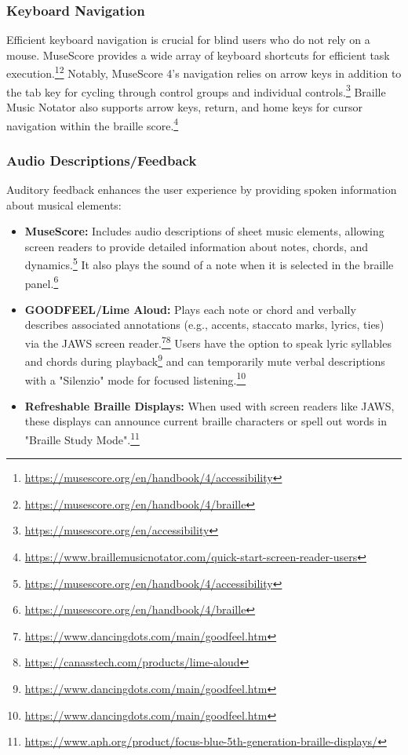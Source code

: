 \subsubsection{Keyboard Navigation}
Efficient keyboard navigation is crucial for blind users who do not rely on a mouse. MuseScore provides a wide array of keyboard shortcuts for efficient task execution.\footnote{\url{https://musescore.org/en/handbook/4/accessibility}}\footnote{\url{https://musescore.org/en/handbook/4/braille}} Notably, MuseScore 4's navigation relies on arrow keys in addition to the tab key for cycling through control groups and individual controls.\footnote{\url{https://musescore.org/en/accessibility}} Braille Music Notator also supports arrow keys, return, and home keys for cursor navigation within the braille score.\footnote{\url{https://www.braillemusicnotator.com/quick-start-screen-reader-users}}

\subsubsection{Audio Descriptions/Feedback}
Auditory feedback enhances the user experience by providing spoken information about musical elements:
\begin{itemize}[noitemsep,topsep=0pt]
    \item \textbf{MuseScore:} Includes audio descriptions of sheet music elements, allowing screen readers to provide detailed information about notes, chords, and dynamics.\footnote{\url{https://musescore.org/en/handbook/4/accessibility}} It also plays the sound of a note when it is selected in the braille panel.\footnote{\url{https://musescore.org/en/handbook/4/braille}}
    \item \textbf{GOODFEEL/Lime Aloud:} Plays each note or chord and verbally describes associated annotations (e.g., accents, staccato marks, lyrics, ties) via the JAWS screen reader.\footnote{\url{https://www.dancingdots.com/main/goodfeel.htm}}\footnote{\url{https://canasstech.com/products/lime-aloud}} Users have the option to speak lyric syllables and chords during playback\footnote{\url{https://www.dancingdots.com/main/goodfeel.htm}} and can temporarily mute verbal descriptions with a "Silenzio" mode for focused listening.\footnote{\url{https://www.dancingdots.com/main/goodfeel.htm}}
    \item \textbf{Refreshable Braille Displays:} When used with screen readers like JAWS, these displays can announce current braille characters or spell out words in "Braille Study Mode".\footnote{\url{https://www.aph.org/product/focus-blue-5th-generation-braille-displays/}}
\end{itemize}

